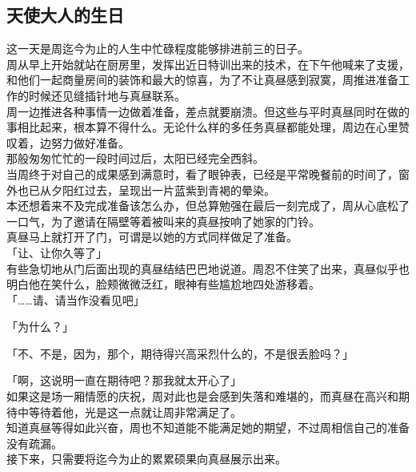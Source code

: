 \subsection{天使大人的生日}

这一天是周迄今为止的人生中忙碌程度能够排进前三的日子。\\

周从早上开始就站在厨房里，发挥出近日特训出来的技术，在下午他喊来了支援，和他们一起商量房间的装饰和最大的惊喜，为了不让真昼感到寂寞，周推进准备工作的时候还见缝插针地与真昼联系。\\

周一边推进各种事情一边做着准备，差点就要崩溃。但这些与平时真昼同时在做的事相比起来，根本算不得什么。无论什么样的多任务真昼都能处理，周边在心里赞叹着，边努力做好准备。\\

那般匆匆忙忙的一段时间过后，太阳已经完全西斜。\\

当周终于对自己的成果感到满意时，看了眼钟表，已经是平常晚餐前的时间了，窗外也已从夕阳红过去，呈现出一片蓝紫到青褐的晕染。\\

本还想着来不及完成准备该怎么办，但总算勉强在最后一刻完成了，周从心底松了一口气，为了邀请在隔壁等着被叫来的真昼按响了她家的门铃。\\

真昼马上就打开了门，可谓是以她的方式同样做足了准备。\\

「让、让你久等了」\\

有些急切地从门后面出现的真昼结结巴巴地说道。周忍不住笑了出来，真昼似乎也明白他在笑什么，脸颊微微泛红，眼神有些尴尬地四处游移着。\\

「……请、请当作没看见吧」

「为什么？」

「不、不是，因为，那个，期待得兴高采烈什么的，不是很丢脸吗？」

「啊，这说明一直在期待吧？那我就太开心了」\\

如果这是场一厢情愿的庆祝，周对此也是会感到失落和难堪的，而真昼在高兴和期待中等待着他，光是这一点就让周非常满足了。\\

知道真昼等得如此兴奋，周也不知道能不能满足她的期望，不过周相信自己的准备没有疏漏。\\

接下来，只需要将迄今为止的累累硕果向真昼展示出来。\\

